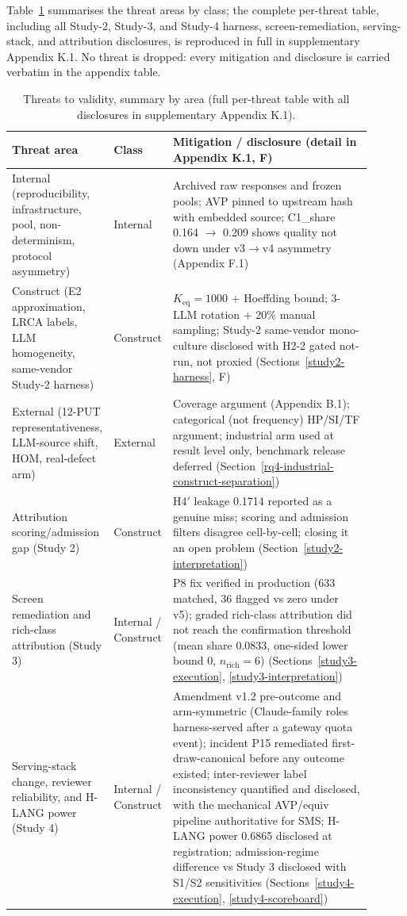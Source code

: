 \documentclass[manuscript,screen,review]{acmart}
\begin{document}
Table~\ref{tab:p2-14} summarises the threat areas by class; the complete
per-threat table, including all Study-2, Study-3, and Study-4 harness,
screen-remediation, serving-stack, and attribution disclosures, is reproduced in full in
supplementary Appendix K.1. No threat is dropped: every mitigation and
disclosure is carried verbatim in the appendix table.

\begin{table}[t]
\caption{Threats to validity, summary by area (full per-threat table with
all disclosures in supplementary Appendix K.1).}\label{tab:p2-14}
\centering
\small
\begin{tabular}{p{0.22\linewidth}p{0.12\linewidth}p{0.56\linewidth}}
\toprule
Threat area & Class & Mitigation / disclosure (detail in Appendix K.1, F) \\
\midrule
Internal (reproducibility, infrastructure, pool, non-determinism, protocol
asymmetry) & Internal & Archived raw responses and frozen pools; AVP pinned to
upstream hash with embedded source; C1\_share 0.164 $\to$ 0.209 shows quality
not down under v3$\to$v4 asymmetry (Appendix F.1) \\
Construct (E2 approximation, LRCA labels, LLM homogeneity, same-vendor
Study-2 harness) & Construct & $K_{\mathrm{eq}}=1000$ + Hoeffding bound; 3-LLM
rotation + 20\% manual sampling; Study-2 same-vendor mono-culture disclosed with
H2-2 gated not-run, not proxied (Sections~\ref{study2-harness}, F) \\
External (12-PUT representativeness, LLM-source shift, HOM, real-defect arm) &
External & Coverage argument (Appendix B.1); categorical (not frequency) HP/SI/TF
argument; industrial arm used at result level only, benchmark release deferred
(Section~\ref{rq4-industrial-construct-separation}) \\
Attribution scoring/admission gap (Study 2) & Construct & H4\('\) leakage 0.1714
reported as a genuine miss; scoring and admission filters disagree cell-by-cell;
closing it an open problem (Section~\ref{study2-interpretation}) \\
Screen remediation and rich-class attribution (Study 3) & Internal / Construct &
P8 fix verified in production (633 matched, 36 flagged vs zero under v5); graded
rich-class attribution did not reach the confirmation threshold (mean share
0.0833, one-sided lower bound 0, $n_{\mathrm{rich}}=6$)
(Sections~\ref{study3-execution}, \ref{study3-interpretation}) \\
Serving-stack change, reviewer reliability, and H-LANG power (Study 4) &
Internal / Construct & Amendment v1.2 pre-outcome and arm-symmetric
(Claude-family roles harness-served after a gateway quota event); incident P15
remediated first-draw-canonical before any outcome existed; inter-reviewer
label inconsistency quantified and disclosed, with the mechanical AVP/equiv
pipeline authoritative for SMS; H-LANG power 0.6865 disclosed at registration;
admission-regime difference vs Study 3 disclosed with S1/S2 sensitivities
(Sections~\ref{study4-execution}, \ref{study4-scoreboard}) \\
\bottomrule
\end{tabular}
\normalsize
\end{table}
\end{document}
